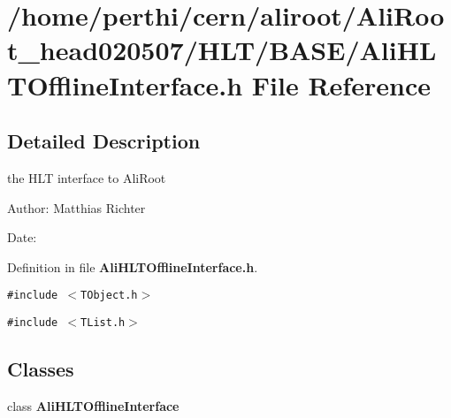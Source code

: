 \section{/home/perthi/cern/aliroot/Ali\-Root\_\-head020507/HLT/BASE/Ali\-HLTOffline\-Interface.h File Reference}
\label{AliHLTOfflineInterface_8h}


\subsection{Detailed Description}
the HLT interface to Ali\-Root 

\begin{Desc}
\item[Author:]Matthias Richter \end{Desc}
\begin{Desc}
\item[Date:]\end{Desc}


Definition in file {\bf Ali\-HLTOffline\-Interface.h}.

{\tt \#include $<$TObject.h$>$}\par
{\tt \#include $<$TList.h$>$}\par
\subsection*{Classes}
\begin{CompactItemize}
\item 
class {\bf Ali\-HLTOffline\-Interface}
\end{CompactItemize}
